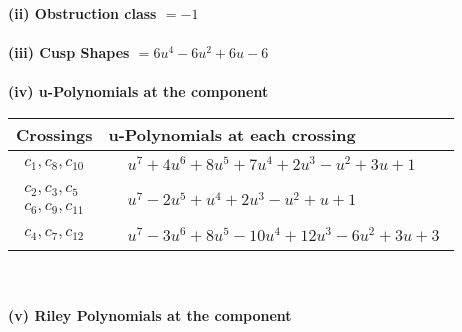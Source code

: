 \documentclass[1p]{elsarticle_modified}
\theoremstyle{definition}
\begin{document}
\flushleft \textbf{(ii) Obstruction class $= -1$}\\~\\
\flushleft \textbf{(iii) Cusp Shapes $= 6 u^4-6 u^2+6 u-6$}\\~\\
\newpage\renewcommand{\arraystretch}{1}
\flushleft \textbf{(iv) u-Polynomials at the component}\newline \\
\begin{tabular}{m{50pt}|m{274pt}}
Crossings & \hspace{64pt}u-Polynomials at each crossing \\
\hline $$\begin{aligned}c_{1},c_{8},c_{10}\end{aligned}$$&$\begin{aligned}
&u^7+4 u^6+8 u^5+7 u^4+2 u^3- u^2+3 u+1
\end{aligned}$\\
\hline $$\begin{aligned}c_{2},c_{3},c_{5}\\c_{6},c_{9},c_{11}\end{aligned}$$&$\begin{aligned}
&u^7-2 u^5+u^4+2 u^3- u^2+u+1
\end{aligned}$\\
\hline $$\begin{aligned}c_{4},c_{7},c_{12}\end{aligned}$$&$\begin{aligned}
&u^7-3 u^6+8 u^5-10 u^4+12 u^3-6 u^2+3 u+3
\end{aligned}$\\
\hline
\end{tabular}\\~\\
\newpage\renewcommand{\arraystretch}{1}
\flushleft \textbf{(v) Riley Polynomials at the component}\newline \\
\end{document}
